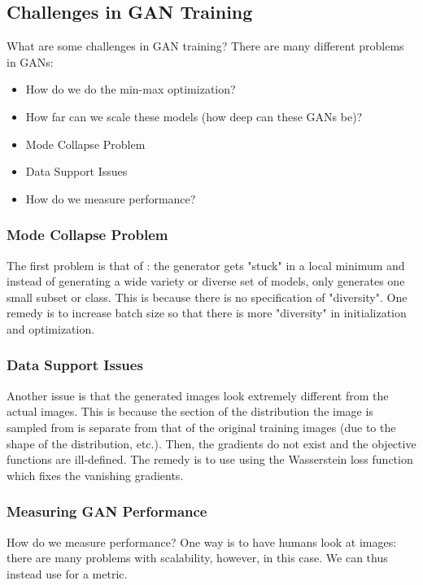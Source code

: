 \documentclass[11pt]{scrartcl}
\begin{document}
\subsection{Challenges in GAN Training}
What are some challenges in GAN training? There are many different problems in GANs:
\begin{itemize}
    \item How do we do the min-max optimization?
    \item How far can we scale these models (how deep can these GANs be)? 
    \item Mode Collapse Problem
    \item Data Support Issues
    \item How do we measure performance?
\end{itemize}

\subsubsection{Mode Collapse Problem}
The first problem is that of : the generator gets "stuck" in a local minimum and instead of generating a wide variety or diverse set of models, only generates one small subset or class. This is because there is no specification of "diversity". One remedy is to increase batch size so that there is more "diversity" in initialization and optimization. 

\subsubsection{Data Support Issues}
Another issue is that the generated images look extremely different from the actual images. This is because the section of the distribution the image is sampled from is separate from that of the original training images (due to the shape of the distribution, etc.). Then, the gradients do not exist and the objective functions are ill-defined. The remedy is to use  using the Wasserstein loss function which fixes the vanishing gradients. 

\subsubsection{Measuring GAN Performance}
How do we measure performance? One way is to have humans look at images: there are many problems with scalability, however, in this case. We can thus instead use  for a metric.  
\end{document}
